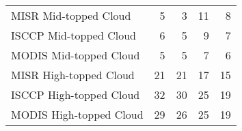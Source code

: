 \begin{tabular}{lrrrr}
   MISR Mid-topped Cloud &                        5 &                        3 &                       11 &                        8 \\
  ISCCP Mid-topped Cloud &                        6 &                        5 &                        9 &                        7 \\
  MODIS Mid-topped Cloud &                        5 &                        5 &                        7 &                        6 \\
  MISR High-topped Cloud &                       21 &                       21 &                       17 &                       15 \\
 ISCCP High-topped Cloud &                       32 &                       30 &                       25 &                       19 \\
 MODIS High-topped Cloud &                       29 &                       26 &                       25 &                       19 \\ \hline
\end{tabular}

